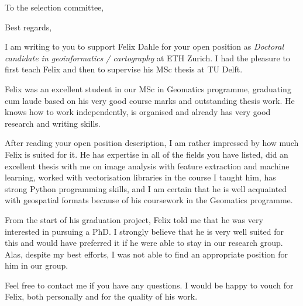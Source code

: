 \documentclass[12pt,a4paper,sans]{moderncv}
\begin{document}
\date{November 13, 2020}
\opening{To the selection committee,}
\closing{Best regards,}
\makelettertitle
I am writing to you to support Felix Dahle for your open position as \emph{Doctoral candidate in geoinformatics / cartography} at ETH Zurich.
I had the pleasure to first teach Felix and then to supervise his MSc thesis at TU Delft.

Felix was an excellent student in our MSc in Geomatics programme, graduating cum laude based on his very good course marks and outstanding thesis work.
He knows how to work independently, is organised and already has very good research and writing skills.

After reading your open position description, I am rather impressed by how much Felix is suited for it.
He has expertise in all of the fields you have listed, did an excellent thesis with me on image analysis with feature extraction and machine learning, worked with vectorisation libraries in the course I taught him, has strong Python programming skills, and I am certain that he is well acquainted with geospatial formats because of his coursework in the Geomatics programme.

From the start of his graduation project, Felix told me that he was very interested in pursuing a PhD.
I strongly believe that he is very well suited for this and would have preferred it if he were able to stay in our research group.
Alas, despite my best efforts, I was not able to find an appropriate position for him in our group.

Feel free to contact me if you have any questions.
I would be happy to vouch for Felix, both personally and for the quality of his work.

\makeletterclosing
\end{document}
